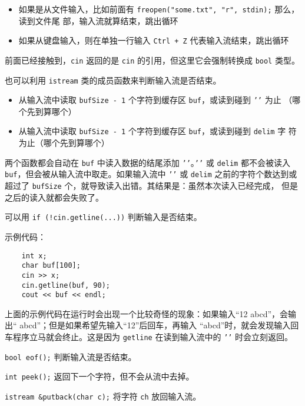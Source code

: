 \documentclass[UTF8]{ctexart}
\begin{document}
\begin{itemize}
    \item 如果是从文件输入，比如前面有 \texttt{freopen("some.txt", "r", stdin);} 那么，读到文件尾
    部，输入流就算结束，跳出循环
    \item 如果从键盘输入，则在单独一行输入 \texttt{Ctrl + Z} 代表输入流结束，跳出循环
\end{itemize}

前面已经接触到，\texttt{cin} 返回的是 \texttt{cin} 的引用，但这里它会强制转换成 \texttt{bool} 类型。

也可以利用 \texttt{istream} 类的成员函数来判断输入流是否结束。

\begin{itemize}
    \item {}
    从输入流中读取 \texttt{bufSize - 1} 个字符到缓存区 \texttt{buf}，或读到碰到 \texttt{'\n'} 为止
    （哪个先到算哪个）
    \item {}
    从输入流中读取 \texttt{bufSize - 1} 个字符到缓存区 \texttt{buf}，或读到碰到 \texttt{delim} 字
    符为止（哪个先到算哪个）
\end{itemize}
两个函数都会自动在 \texttt{buf} 中读入数据的结尾添加 \texttt{'\0'}。\texttt{'\n'} 或
\texttt{delim} 都不会被读入 \texttt{buf}，但会被从输入流中取走。如果输入流中 \texttt{'\n'} 或
\texttt{delim} 之前的字符个数达到或超过了 \texttt{bufSize} 个，就导致读入出错。其结果是：虽然本次读入已经完成，
但是之后的读入就都会失败了。

可以用 \texttt{if (!cin.getline(...))} 判断输入是否结束。

示例代码：
\begin{verbatim}
    int x;
    char buf[100];
    cin >> x;
    cin.getline(buf, 90);
    cout << buf << endl;
\end{verbatim}

上面的示例代码在运行时会出现一个比较奇怪的现象：如果输入“12 abcd”，会输出“ abcd”；但是如果希望先输入“12”后回车，再输入
“abcd”时，就会发现输入回车程序立马就会终止。这是因为 \texttt{getline} 在读到输入流中的 \texttt{'\n'}
时会立刻返回。

\texttt{bool eof();} 判断输入流是否结束。

\texttt{int peek();} 返回下一个字符，但不会从流中去掉。

\texttt{istream &putback(char c);} 将字符 \texttt{ch} 放回输入流。
\end{document}
